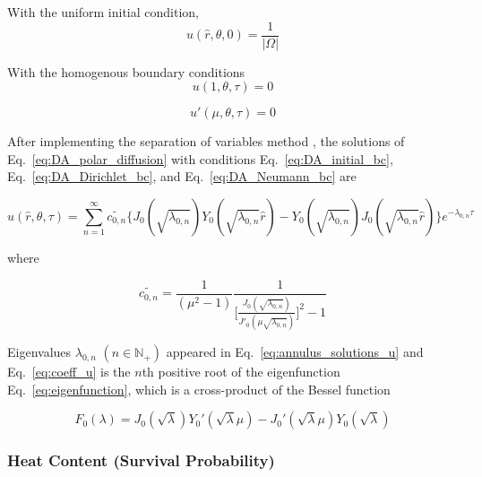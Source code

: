 With the uniform initial condition,
\begin{equation}\label{eq:DA_initial_bc}
  u(\hat r, \theta, 0) = \frac{1}{|\Omega|}
\end{equation}

With the homogenous boundary conditions
\begin{equation}\label{eq:DA_Dirichlet_bc}
  u(1, \theta, \tau) = 0
\end{equation}

\begin{equation}\label{eq:DA_Neumann_bc}
  u'(\mu, \theta, \tau) = 0
\end{equation}



After implementing the separation of variables method
\cite{crank1979mathematics}, the solutions of
Eq.~\ref{eq:DA_polar_diffusion} with conditions
Eq.~\ref{eq:DA_initial_bc}, Eq.~\ref{eq:DA_Dirichlet_bc}, and
Eq.~\ref{eq:DA_Neumann_bc} are

\begin{equation}\label{eq:annulus_solutions_u}
  u(\hat r, \theta, \tau) = \sum_{n=1}^{\infty}
  \tilde{c_{0,n}} \bigg\{J_0(\sqrt{\lambda_{0,n}})
  Y_0(\sqrt{\lambda_{0,n}} \hat r) -
  Y_0(\sqrt{\lambda_{0,n}}) J_0(\sqrt{\lambda_{0,n}} \hat
  r)\bigg\} e^{-\lambda_{0,n}\tau}
\end{equation}

where

\begin{equation}\label{eq:coeff_u}
  \tilde{c_{0,n}} = \frac{1}{(\mu^2 - 1)}
\frac{1}{\bigg[\frac{J_0(\sqrt{\lambda_{0,n}})}{J'_0(\mu
      \sqrt{\lambda_{0,n}})}\bigg]^2 -1}
\end{equation}


Eigenvalues $\lambda_{0, n}$ $(n \in \mathbb{N}_{+})$ appeared in
Eq.~\ref{eq:annulus_solutions_u} and Eq.~\ref{eq:coeff_u} is the $n$th
positive root of the eigenfunction Eq.~\ref{eq:eigenfunction}, which
is a cross-product of the Bessel function \cite{watson1995treatise}

\begin{equation}\label{eq:eigenfunction}
  F_0(\lambda) = J_0(\sqrt{\lambda}) Y_0'(\sqrt{\lambda} \mu) -
  J_0'(\sqrt{\lambda} \mu) Y_0(\sqrt{\lambda})
\end{equation}


\subsubsection{Heat Content (Survival Probability)}

